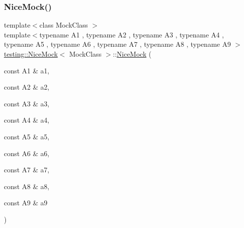 \mbox{\label{classtesting_1_1NiceMock_a61cfc9282222928590bcdaf851a806c6}} 
\subsubsection{\texorpdfstring{NiceMock()}{NiceMock()}\hspace{0.1cm}{\footnotesize\ttfamily [10/11]}}
{\footnotesize\ttfamily template$<$class Mock\+Class $>$ \\
template$<$typename A1 , typename A2 , typename A3 , typename A4 , typename A5 , typename A6 , typename A7 , typename A8 , typename A9 $>$ \\
\mbox{\hyperlink{classtesting_1_1NiceMock}{testing\+::\+Nice\+Mock}}$<$ Mock\+Class $>$\+::\mbox{\hyperlink{classtesting_1_1NiceMock}{Nice\+Mock}} (\begin{DoxyParamCaption}\item[{const A1 \&}]{a1,  }\item[{const A2 \&}]{a2,  }\item[{const A3 \&}]{a3,  }\item[{const A4 \&}]{a4,  }\item[{const A5 \&}]{a5,  }\item[{const A6 \&}]{a6,  }\item[{const A7 \&}]{a7,  }\item[{const A8 \&}]{a8,  }\item[{const A9 \&}]{a9 }\end{DoxyParamCaption})\hspace{0.3cm}{\ttfamily [inline]}}

\mbox{\label{classtesting_1_1NiceMock_a4baf1da52f4c892fc02f6ba10c0b8c02}} 
